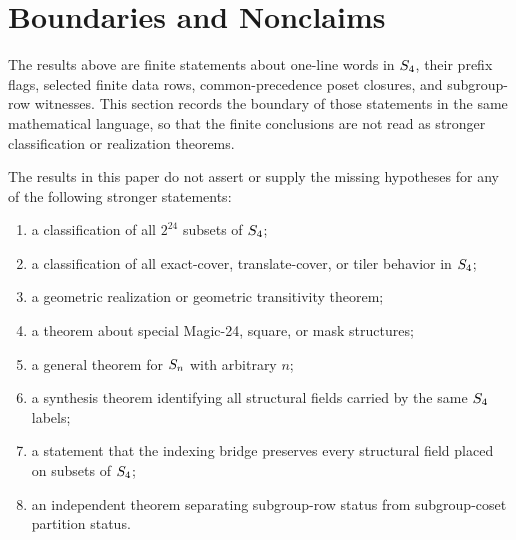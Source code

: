 \section{Boundaries and Nonclaims}
\label{sec:boundaries}

The results above are finite statements about one-line words in \(S_4\), their prefix flags, selected finite data rows, common-precedence poset closures, and subgroup-row witnesses. This section records the boundary of those statements in the same mathematical language, so that the finite conclusions are not read as stronger classification or realization theorems.

\begin{proposition}
\label{prop:paper-boundary}
The results in this paper do not assert or supply the missing hypotheses for any of the following stronger statements:
\begin{enumerate}[label=(\alph*)]
\item a classification of all \(2^{24}\) subsets of \(S_4\);
\item a classification of all exact-cover, translate-cover, or tiler behavior in \(S_4\);
\item a geometric realization or geometric transitivity theorem;
\item a theorem about special Magic-24, square, or mask structures;
\item a general theorem for \(S_n\) with arbitrary \(n\);
\item a synthesis theorem identifying all structural fields carried by the same \(S_4\) labels;
\item a statement that the indexing bridge preserves every structural field placed on subsets of \(S_4\);
\item an independent theorem separating subgroup-row status from subgroup-coset partition status.
\end{enumerate}
\end{proposition}

